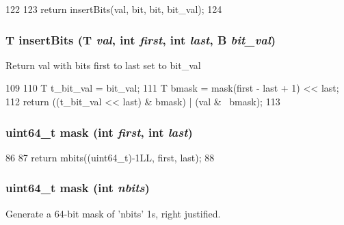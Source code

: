 \begin{DoxyCode}
122 {
123     return insertBits(val, bit, bit, bit_val);
124 }
\end{DoxyCode}
\hypertarget{bitfield_8hh_a2aa7004e37a8c54bf3e5ce81c3125075}{
\subsubsection[{insertBits}]{\setlength{\rightskip}{0pt plus 5cm}T insertBits (T {\em val}, \/  int {\em first}, \/  int {\em last}, \/  B {\em bit\_\-val})}}
\label{bitfield_8hh_a2aa7004e37a8c54bf3e5ce81c3125075}
Return val with bits first to last set to bit\_\-val 


\begin{DoxyCode}
109 {
110     T t_bit_val = bit_val;
111     T bmask = mask(first - last + 1) << last;
112     return ((t_bit_val << last) & bmask) | (val & ~bmask);
113 }
\end{DoxyCode}
\hypertarget{bitfield_8hh_abf6e0f9b301b3adfd6698a71071d96ba}{
\subsubsection[{mask}]{\setlength{\rightskip}{0pt plus 5cm}uint64\_\-t mask (int {\em first}, \/  int {\em last})}}
\label{bitfield_8hh_abf6e0f9b301b3adfd6698a71071d96ba}



\begin{DoxyCode}
86 {
87     return mbits((uint64_t)-1LL, first, last);
88 }
\end{DoxyCode}
\hypertarget{bitfield_8hh_a8c8532a71d351341a5f90d44e4b40c64}{
\subsubsection[{mask}]{\setlength{\rightskip}{0pt plus 5cm}uint64\_\-t mask (int {\em nbits})}}
\label{bitfield_8hh_a8c8532a71d351341a5f90d44e4b40c64}
Generate a 64-\/bit mask of 'nbits' 1s, right justified. 


